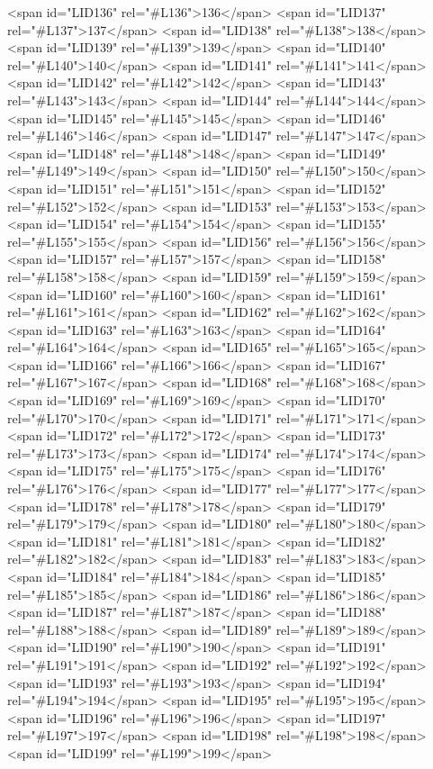<span id="LID136" rel="#L136">136</span>
<span id="LID137" rel="#L137">137</span>
<span id="LID138" rel="#L138">138</span>
<span id="LID139" rel="#L139">139</span>
<span id="LID140" rel="#L140">140</span>
<span id="LID141" rel="#L141">141</span>
<span id="LID142" rel="#L142">142</span>
<span id="LID143" rel="#L143">143</span>
<span id="LID144" rel="#L144">144</span>
<span id="LID145" rel="#L145">145</span>
<span id="LID146" rel="#L146">146</span>
<span id="LID147" rel="#L147">147</span>
<span id="LID148" rel="#L148">148</span>
<span id="LID149" rel="#L149">149</span>
<span id="LID150" rel="#L150">150</span>
<span id="LID151" rel="#L151">151</span>
<span id="LID152" rel="#L152">152</span>
<span id="LID153" rel="#L153">153</span>
<span id="LID154" rel="#L154">154</span>
<span id="LID155" rel="#L155">155</span>
<span id="LID156" rel="#L156">156</span>
<span id="LID157" rel="#L157">157</span>
<span id="LID158" rel="#L158">158</span>
<span id="LID159" rel="#L159">159</span>
<span id="LID160" rel="#L160">160</span>
<span id="LID161" rel="#L161">161</span>
<span id="LID162" rel="#L162">162</span>
<span id="LID163" rel="#L163">163</span>
<span id="LID164" rel="#L164">164</span>
<span id="LID165" rel="#L165">165</span>
<span id="LID166" rel="#L166">166</span>
<span id="LID167" rel="#L167">167</span>
<span id="LID168" rel="#L168">168</span>
<span id="LID169" rel="#L169">169</span>
<span id="LID170" rel="#L170">170</span>
<span id="LID171" rel="#L171">171</span>
<span id="LID172" rel="#L172">172</span>
<span id="LID173" rel="#L173">173</span>
<span id="LID174" rel="#L174">174</span>
<span id="LID175" rel="#L175">175</span>
<span id="LID176" rel="#L176">176</span>
<span id="LID177" rel="#L177">177</span>
<span id="LID178" rel="#L178">178</span>
<span id="LID179" rel="#L179">179</span>
<span id="LID180" rel="#L180">180</span>
<span id="LID181" rel="#L181">181</span>
<span id="LID182" rel="#L182">182</span>
<span id="LID183" rel="#L183">183</span>
<span id="LID184" rel="#L184">184</span>
<span id="LID185" rel="#L185">185</span>
<span id="LID186" rel="#L186">186</span>
<span id="LID187" rel="#L187">187</span>
<span id="LID188" rel="#L188">188</span>
<span id="LID189" rel="#L189">189</span>
<span id="LID190" rel="#L190">190</span>
<span id="LID191" rel="#L191">191</span>
<span id="LID192" rel="#L192">192</span>
<span id="LID193" rel="#L193">193</span>
<span id="LID194" rel="#L194">194</span>
<span id="LID195" rel="#L195">195</span>
<span id="LID196" rel="#L196">196</span>
<span id="LID197" rel="#L197">197</span>
<span id="LID198" rel="#L198">198</span>
<span id="LID199" rel="#L199">199</span>
